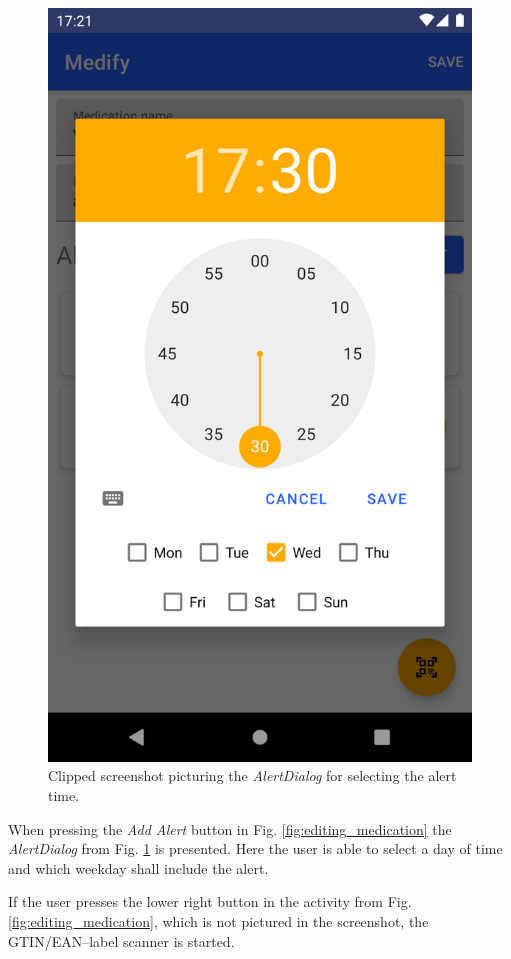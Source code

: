 \documentclass[conference]{IEEEtran}
\begin{document}
\begin{figure}[H]
	\centerline{\includegraphics[trim={0 310px 0 250px},clip,width=0.8\linewidth]{images/screenshots/adding_alert.png}}
	\caption{Clipped screenshot picturing the \textit{AlertDialog} for selecting the alert time.}
	\label{fig:adding_alert}
\end{figure}

When pressing the \textit{Add Alert} button in Fig. \ref{fig:editing_medication} the \textit{AlertDialog} from
Fig. \ref{fig:adding_alert} is presented. Here the user is able to select a day of time and which weekday shall
include the alert.

If the user presses the lower right button in the activity from Fig. \ref{fig:editing_medication}, which is not
pictured in the screenshot, the GTIN/EAN--label scanner is started.
\end{document}
